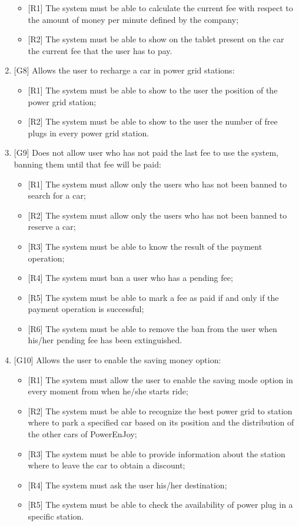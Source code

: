 \begin{enumerate}
\begin{itemize}
	\item {[R1]} The system must be able to calculate the current fee with respect to the amount of money per minute defined by the company;
	\item {[R2]} The system must be able to show on the tablet present on the car the current fee that the user has to pay.
\end{itemize}

\item {[G8]} Allows the user to recharge a car in power grid stations:

\begin{itemize}
	\item {[R1]} The system must be able to show to the user the position of the power grid station;
	\item {[R2]} The system must be able to show to the user the number of free plugs in every power grid station.
\end{itemize}

\item {[G9]} Does not allow user who has not paid the last fee to use the system, banning them until that fee will be paid:

\begin{itemize}
	\item {[R1]} The system must allow only the users who has not been banned to search for a car;
	\item {[R2]} The system must allow only the users who has not been banned to reserve a car;
	\item {[R3]} The system must be able to know the result of the payment operation;
	\item {[R4]} The system must ban a user who has a pending fee;
	\item {[R5]} The system must be able to mark a fee as paid if and only if the payment operation is successful;
	\item {[R6]} The system must be able to remove the ban from the user when his/her pending fee has been extinguished.
\end{itemize}

\item {[G10]} Allows the user to enable the saving money option:

\begin{itemize}
	\item {[R1]} The system must allow the user to enable the saving mode option in every moment from when he/she starts ride;
	\item {[R2]} The system must be able to recognize the best power grid to station where to park a specified car based on its position and the distribution of the other cars of PowerEnJoy;
	\item {[R3]} The system must be able to provide information about the station where to leave the car to obtain a discount;
	\item {[R4]} The system must ask the user his/her destination;
	\item {[R5]} The system must be able to check the availability of power plug in a specific station.
\end{itemize}


\end{enumerate}

